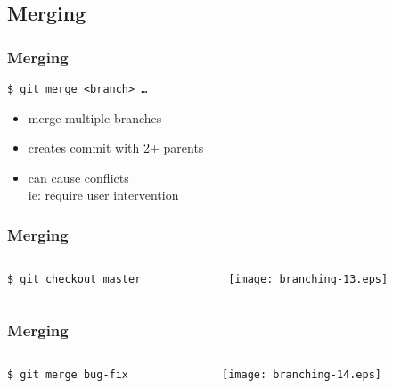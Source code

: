 \documentclass[english]{beamer}
\newcommand{\mysubsection}[2]{%
  \hypertarget{#2}{}%
  \subsection{#1}%
  \label{#2}%
}
\newcommand{\CMD}[1]{%
\texttt{\textcolor{code-blue}{#1}}%
}
\newcommand{\faint}[1]{%
\textcolor{code-gray}{#1}%
}
\newcommand{\red}[1]{%
\textcolor{code-red}{#1}%
}
\begin{document}
\mysubsection{Merging}{using:merging}
\begin{frame}
\frametitle{Merging}

\CMD{\$ git merge <branch> \ldots} \\
\begin{itemize}
        \item merge multiple branches
        \item creates commit with 2+ parents
        \item can cause \red{conflicts} \\
                \faint{ie: require user intervention}
\end{itemize}
\end{frame}

\begin{frame}
\frametitle{Merging}

\begin{columns}[t]
        \begin{column}[T]{.5\textwidth}
                {\small
                \CMD{\$ git checkout master} \\
                }
        \end{column}
        \begin{column}[T]{.5\textwidth}
                \texttt{[image: branching-13.eps]}
        \end{column}
\end{columns}
\end{frame}

\begin{frame}
\frametitle{Merging}

\begin{columns}[t]
        \begin{column}[T]{.5\textwidth}
                {\small
                \CMD{\$ git merge bug-fix} \\
                }
        \end{column}
        \begin{column}[T]{.5\textwidth}
                \texttt{[image: branching-14.eps]}
        \end{column}
\end{columns}
\end{frame}
\end{document}
